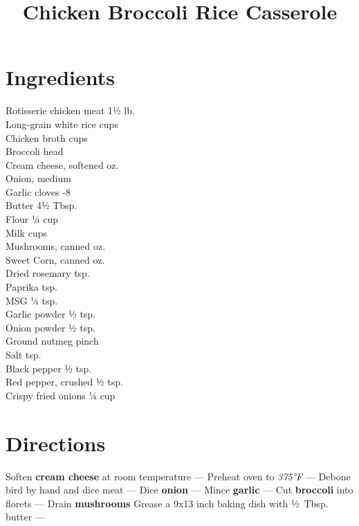\documentclass[11pt,letterpaper]{article}
\title{Chicken Broccoli Rice Casserole}
\author{}
\date{}
\begin{document}
\maketitle
\thispagestyle{empty}

\section*{Ingredients}
\setlength{\columnsep}{20pt}
\begin{multicols}{2}
\noindent
    Rotisserie chicken meat \dotfill 1½ lb. \\
    Long-grain white rice  cups \\
    Chicken broth  cups \\
    Broccoli  head \\
    Cream cheese, softened  oz. \\
    Onion, medium  \\
    Garlic cloves -8 \\
    Butter \dotfill 4½ Tbsp. \\
    Flour \dotfill ¼ cup \\
    Milk  cups \\
    \columnbreak
    Mushrooms, canned  oz. \\
    Sweet Corn, canned  oz. \\
    Dried rosemary  tsp. \\
    Paprika  tsp. \\
    MSG \dotfill ¼ tsp. \\
    Garlic powder \dotfill ½ tsp. \\
    Onion powder \dotfill ½ tsp. \\
    Ground nutmeg \dotfill pinch \\
    Salt  tsp. \\
    Black pepper \dotfill ½ tsp. \\
    Red pepper, crushed \dotfill ½ tsp. \\
    Crispy fried onions \dotfill ¼ cup
\end{multicols}

\section*{Directions}

\noindent
Soften \textbf{cream cheese} at room temperature ---
Preheat oven to \textit{375°F} ---
Debone bird by hand and dice meat ---
Dice \textbf{onion} ---
Mince \textbf{garlic} ---
Cut \textbf{broccoli} into florets ---
Drain \textbf{mushrooms}
Grease a 9x13 inch baking dish with ½~Tbsp. butter ---
\end{document}
